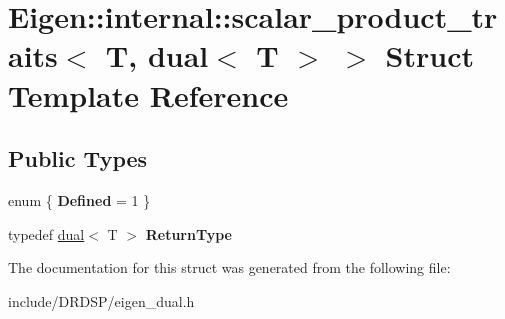 \hypertarget{struct_eigen_1_1internal_1_1scalar__product__traits_3_01_t_00_01dual_3_01_t_01_4_01_4}{\section{Eigen\-:\-:internal\-:\-:scalar\-\_\-product\-\_\-traits$<$ T, dual$<$ T $>$ $>$ Struct Template Reference}
\label{struct_eigen_1_1internal_1_1scalar__product__traits_3_01_t_00_01dual_3_01_t_01_4_01_4}
}
\subsection*{Public Types}
\begin{DoxyCompactItemize}
\item 
enum \{ {\bfseries Defined} = 1
 \}
\item 
\hypertarget{struct_eigen_1_1internal_1_1scalar__product__traits_3_01_t_00_01dual_3_01_t_01_4_01_4_ade2ec61ed4cbf4c325f0eb3f80a31918}{typedef \hyperlink{struct_d_r_d_s_p_1_1dual}{dual}$<$ T $>$ {\bfseries Return\-Type}}\label{struct_eigen_1_1internal_1_1scalar__product__traits_3_01_t_00_01dual_3_01_t_01_4_01_4_ade2ec61ed4cbf4c325f0eb3f80a31918}

\end{DoxyCompactItemize}


The documentation for this struct was generated from the following file\-:\begin{DoxyCompactItemize}
\item 
include/\-D\-R\-D\-S\-P/eigen\-\_\-dual.\-h\end{DoxyCompactItemize}
